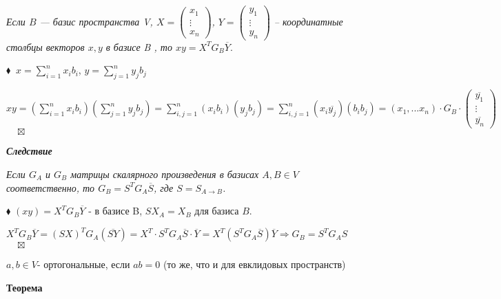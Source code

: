 \documentclass[a4paper, 12pt]{report}
\begin{document}
	\textit{Если $B$ --- базис пространства V, $X=\begin{pmatrix}x_1\\ \vdots \\ x_n\end{pmatrix}$, $Y=\begin{pmatrix}y_1\\ \vdots \\ y_n\end{pmatrix}$ – координатные столбцы векторов $x,y$ в базисе B , то $xy = X^TG_B\overline{Y}$}.
	\par\bigskip
	$\blacklozenge\ $
	$x=\sum\limits_{i=1}^{n}{x_ib_i}$, $y=\sum\limits_{j=1}^{n}{y_jb_j}$
	\par%
	$xy=(\sum\limits_{i=1}^{n}{x_ib_i})(\sum\limits_{j=1}^{n}{y_jb_j})=\sum\limits_{i,j=1}^{n}{(x_ib_i)(y_jb_j)}=\sum\limits_{i,j=1}^{n}{(x_i\overline{y_j})(b_ib_j)}=(x_1,...x_n)\cdot G_B\cdot \begin{pmatrix}\overline{y_1}\\ \vdots \\ \overline{y_n}\end{pmatrix}$
	$ \quad \boxtimes$
	\par\bigskip
	\textit{\textbf{Следствие}}
	
	\textit {Если $G_A$ и $G_B$ матрицы скалярного произведения в базисах
		$A,B \in V$ соответственно, то $G_B = S^T G_A \overline{S}$, где $S=S_{A\rightarrow B}$.}
	\par\bigskip
	$\blacklozenge$ 
	$(xy) = X^TG_B\overline{Y}$ - в базисе B, $SX_A=X_B$ для базиса $B$.
	\par\bigskip
	$X^TG_B\overline{Y}=(SX)^TG_A(\overline{SY})=X^T\cdot S^TG_A\overline{S}\cdot \overline{Y}=X^T(S^TG_A\overline{S})\overline{Y}\Rightarrow G_B=S^TG_AS$
	$\quad\boxtimes$
	\par\bigskip
	$a,b\in V$- ортогональные, если $ab=0$ (то же, что и для евклидовых пространств)
	\par\bigskip
	\textbf{Теорема}
	
\end{document}
